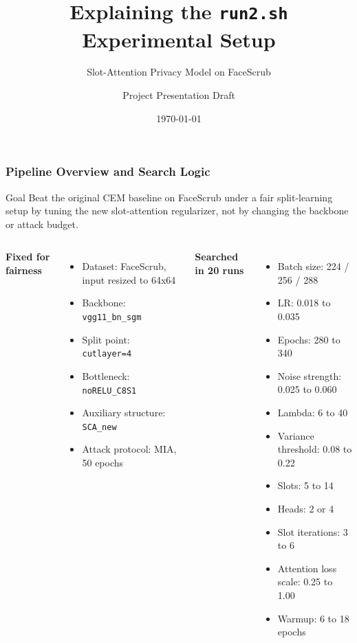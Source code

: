 \documentclass[aspectratio=169]{beamer}
\title{Explaining the \texttt{run2.sh} Experimental Setup}
\subtitle{Slot-Attention Privacy Model on FaceScrub}
\author{Project Presentation Draft}
\date{\today}
\begin{document}
\begin{frame}
    \titlepage
\end{frame}

\begin{frame}
    \frametitle{Pipeline Overview and Search Logic}
    \scriptsize
    \begin{block}{Goal}
        Beat the original CEM baseline on FaceScrub under a fair split-learning setup by tuning the \alert{new slot-attention regularizer}, not by changing the backbone or attack budget.
    \end{block}

    \begin{columns}[T]
        \textbf{Fixed for fairness}
        \begin{itemize}
            \item Dataset: FaceScrub, input resized to 64x64
            \item Backbone: \texttt{vgg11\_bn\_sgm}
            \item Split point: \texttt{cutlayer=4}
            \item Bottleneck: \texttt{noRELU\_C8S1}
            \item Auxiliary structure: \texttt{SCA\_new}
            \item Attack protocol: MIA, 50 epochs
        \end{itemize}

        \textbf{Searched in 20 runs}
        \begin{itemize}
            \item Batch size: 224 / 256 / 288
            \item LR: 0.018 to 0.035
            \item Epochs: 280 to 340
            \item Noise strength: 0.025 to 0.060
            \item Lambda: 6 to 40
            \item Variance threshold: 0.08 to 0.22
            \item Slots: 5 to 14
            \item Heads: 2 or 4
            \item Slot iterations: 3 to 6
            \item Attention loss scale: 0.25 to 1.00
            \item Warmup: 6 to 18 epochs
        \end{itemize}
    \end{columns}
\end{frame}
\end{document}
